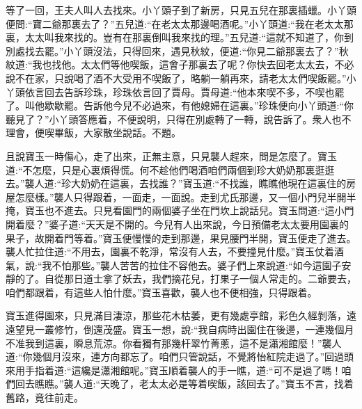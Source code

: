 \begin{parag}
\end{parag}


\begin{parag}
    等了一回，王夫人叫人去找來。小丫頭子到了新房，只見五兒在那裏插蠟。小丫頭便問:“寶二爺那裏去了？”五兒道:“在老太太那邊喝酒呢。”小丫頭道:“我在老太太那裏，太太叫我來找的。豈有在那裏倒叫我來找的理。”五兒道:“這就不知道了，你到別處找去罷。”小丫頭沒法，只得回來，遇見秋紋，便道:“你見二爺那裏去了？”秋紋道:“我也找他。太太們等他喫飯，這會子那裏去了呢？你快去回老太太去，不必說不在家，只說喝了酒不大受用不喫飯了，略躺一躺再來，請老太太們喫飯罷。”小丫頭依言回去告訴珍珠，珍珠依言回了賈母。賈母道:“他本來喫不多，不喫也罷了。叫他歇歇罷。告訴他今兒不必過來，有他媳婦在這裏。”珍珠便向小丫頭道:“你聽見了？”小丫頭答應着，不便說明，只得在別處轉了一轉，說告訴了。衆人也不理會，便喫畢飯，大家散坐說話。不題。
\end{parag}


\begin{parag}
    且說寶玉一時傷心，走了出來，正無主意，只見襲人趕來，問是怎麼了。寶玉道:“不怎麼，只是心裏煩得慌。何不趁他們喝酒咱們兩個到珍大奶奶那裏逛逛去。”襲人道:“珍大奶奶在這裏，去找誰？”寶玉道:“不找誰，瞧瞧他現在這裏住的房屋怎麼樣。”襲人只得跟着，一面走，一面說。走到尤氏那邊，又一個小門兒半開半掩，寶玉也不進去。只見看園門的兩個婆子坐在門坎上說話兒。寶玉問道:“這小門開着麼？”婆子道:“天天是不開的。今兒有人出來說，今日預備老太太要用園裏的果子，故開着門等着。”寶玉便慢慢的走到那邊，果見腰門半開，寶玉便走了進去。襲人忙拉住道:“不用去，園裏不乾淨，常沒有人去，不要撞見什麼。”寶玉仗着酒氣，說:“我不怕那些。”襲人苦苦的拉住不容他去。婆子們上來說道:“如今這園子安靜的了。自從那日道士拿了妖去，我們摘花兒，打果子一個人常走的。二爺要去，咱們都跟着，有這些人怕什麼。”寶玉喜歡，襲人也不便相強，只得跟着。
\end{parag}


\begin{parag}
    寶玉進得園來，只見滿目淒涼，那些花木枯萎，更有幾處亭館，彩色久經剝落，遠遠望見一叢修竹，倒還茂盛。寶玉一想，說:“我自病時出園住在後邊，一連幾個月不准我到這裏，瞬息荒涼。你看獨有那幾杆翠竹菁蔥，這不是瀟湘館麼！”襲人道:“你幾個月沒來，連方向都忘了。咱們只管說話，不覺將怡紅院走過了。”回過頭來用手指着道:“這纔是瀟湘館呢。”寶玉順着襲人的手一瞧，道:“可不是過了嗎！咱們回去瞧瞧。”襲人道:“天晚了，老太太必是等着喫飯，該回去了。”寶玉不言，找着舊路，竟往前走。
\end{parag}


